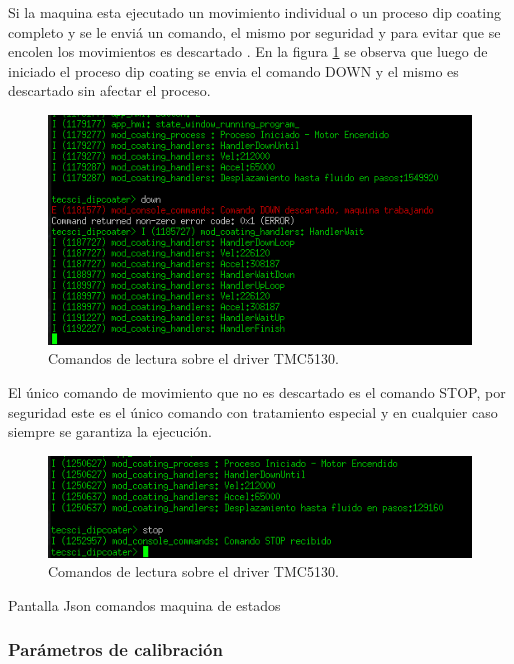 Si la maquina esta ejecutado un movimiento individual o un proceso dip coating completo y se le enviá un comando, el mismo por seguridad y para evitar que se encolen los movimientos es descartado . En la figura 
\ref{fig:consola_comando_ok} se observa que luego de iniciado el proceso dip coating se envia el comando DOWN y el mismo es descartado sin afectar el proceso.

\begin{figure}[h!]
	\centering
	\includegraphics[width=1\textwidth]{./Figures/consola_4.png}
	\caption{Comandos de lectura sobre el driver TMC5130.}
	\label{fig:consola_comando_ok}
\end{figure}

El único comando de movimiento que no es descartado es el comando STOP, por seguridad este es el único  comando con tratamiento especial y en cualquier caso siempre se garantiza la ejecución.

\begin{figure}[h!]
	\centering
	\includegraphics[width=1\textwidth]{./Figures/consola_5.png}
	\caption{Comandos de lectura sobre el driver TMC5130.}
	\label{fig:consola_comando_false}
\end{figure}


Pantalla 
Json comandos
maquina de estados



 
\subsubsection{Parámetros de calibración}
\label{subsec:calibracion}

